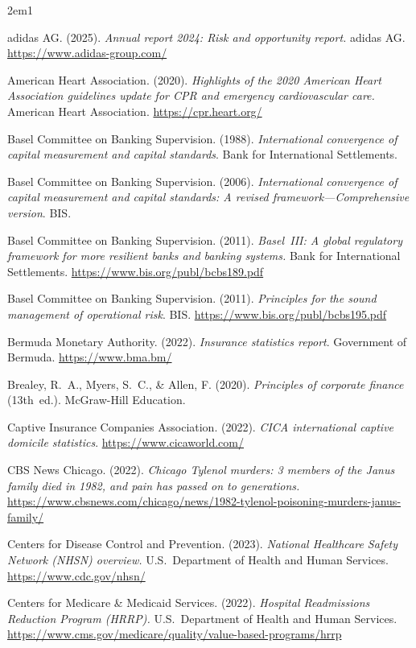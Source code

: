 \begin{hangparas}{2em}{1}

adidas AG. (2025). \emph{Annual report 2024: Risk and opportunity report.}
adidas AG. \url{https://www.adidas-group.com/}

American Heart Association. (2020). \emph{Highlights of the 2020 American
Heart Association guidelines update for CPR and emergency cardiovascular
care.} American Heart Association. \url{https://cpr.heart.org/}

Basel Committee on Banking Supervision. (1988). \emph{International
convergence of capital measurement and capital standards}. Bank for
International Settlements.

Basel Committee on Banking Supervision. (2006). \emph{International
convergence of capital measurement and capital standards: A revised
framework---Comprehensive version}. BIS.

Basel Committee on Banking Supervision. (2011). \emph{Basel~III: A global
regulatory framework for more resilient banks and banking systems.} Bank for
International Settlements. \url{https://www.bis.org/publ/bcbs189.pdf}

Basel Committee on Banking Supervision. (2011). \emph{Principles for the
sound management of operational risk}. BIS.
\url{https://www.bis.org/publ/bcbs195.pdf}

Bermuda Monetary Authority. (2022). \emph{Insurance statistics report}.
Government of Bermuda. \url{https://www.bma.bm/}

Brealey, R.~A., Myers, S.~C., \& Allen, F. (2020). \emph{Principles of
corporate finance} (13th~ed.). McGraw-Hill Education.

Captive Insurance Companies Association. (2022). \emph{CICA international
captive domicile statistics}. \url{https://www.cicaworld.com/}

CBS News Chicago. (2022). \emph{Chicago Tylenol murders: 3 members of the
Janus family died in 1982, and pain has passed on to generations.}
\url{https://www.cbsnews.com/chicago/news/1982-tylenol-poisoning-murders-janus-family/}

Centers for Disease Control and Prevention. (2023). \emph{National Healthcare
Safety Network (NHSN) overview.} U.S.\ Department of Health and Human
Services. \url{https://www.cdc.gov/nhsn/}

Centers for Medicare \& Medicaid Services. (2022). \emph{Hospital Readmissions
Reduction Program (HRRP).} U.S.\ Department of Health and Human Services.
\url{https://www.cms.gov/medicare/quality/value-based-programs/hrrp}


\end{hangparas}
